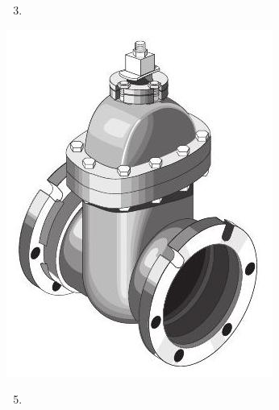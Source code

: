 \documentclass[10pt]{article}
\begin{document}
\begin{enumerate}
  \setcounter{enumi}{2}
  \item 
\end{enumerate}
\includegraphics[max width=\textwidth]{2022_11_03_fc0cbc2f3612fab6edd2g-20(3)}

\begin{enumerate}
  \setcounter{enumi}{4}
  \item 
\end{enumerate}
\end{document}
